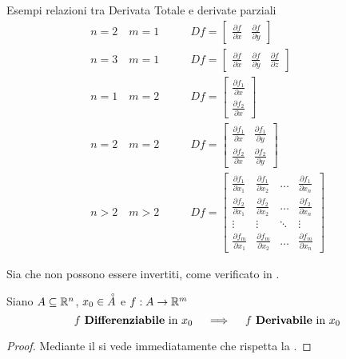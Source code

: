\begin{example}
	\label{ex:Df_e_deriv_parz}
	Esempi relazioni tra Derivata Totale e derivate parziali
	\begin{align*}
		n = 2 \quad m = 1 \qquad & Df =
		\begin{bmatrix}
			\frac{\partial f}{\partial x} & \frac{\partial f}{\partial y}
		\end{bmatrix}\\
		n = 3 \quad m = 1 \qquad & Df =
		\begin{bmatrix}
			\frac{\partial f}{\partial x} & \frac{\partial f}{\partial y} &  \frac{\partial f}{\partial z}
		\end{bmatrix}\\
		n = 1 \quad m = 2 \qquad & Df =
		\begin{bmatrix}
			\frac{\partial f_1}{\partial x}\\[1ex]
			\frac{\partial f_2}{\partial x}
		\end{bmatrix}\\
		n = 2 \quad m = 2 \qquad & Df =
		\begin{bmatrix}
			\frac{\partial f_1}{\partial x} & \frac{\partial f_1}{\partial y}\\[1ex]
			\frac{\partial f_2}{\partial x} & \frac{\partial f_2}{\partial y}
		\end{bmatrix}\\
		n > 2 \quad m > 2 \qquad & Df =
		\begin{bmatrix}
			\frac{\partial f_1}{\partial x_1} & \frac{\partial f_1}{\partial x_2} & \dots & \frac{\partial f_1}{\partial x_n}\\[1ex]
			\frac{\partial f_2}{\partial x_1} & \frac{\partial f_2}{\partial x_2} & \dots & \frac{\partial f_2}{\partial x_n}\\[1ex]
			\vdots & \vdots & \ddots & \vdots\\[1ex]
			\frac{\partial f_m}{\partial x_1} & \frac{\partial f_m}{\partial x_2} & \dots & \frac{\partial f_m}{\partial x_n}
		\end{bmatrix}
	\end{align*}
\end{example}
\begin{observation}
	Sia  che  non possono essere invertiti, come verificato in .
\end{observation}
\begin{corollary}
	Siano $A \subseteq \mathbb{R}^n$, $x_0 \in \accentset{\circ}{A}$ e $f:A \to \mathbb{R}^m$
	\[
		f \text{ \textbf{Differenziabile} in } x_0
		\quad \implies \quad
		f \text{ \textbf{Derivabile} in } x_0
	\]
	\begin{proof}
		Mediante il  si vede immediatamente che rispetta la .
	\end{proof}
\end{corollary}
